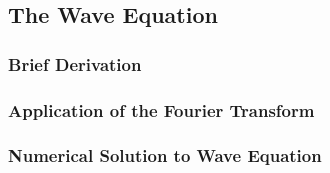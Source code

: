 \subsection{The Wave Equation}

\subsubsection{Brief Derivation}

\subsubsection{Application of the Fourier Transform}

\subsubsection{Numerical Solution to Wave Equation}


